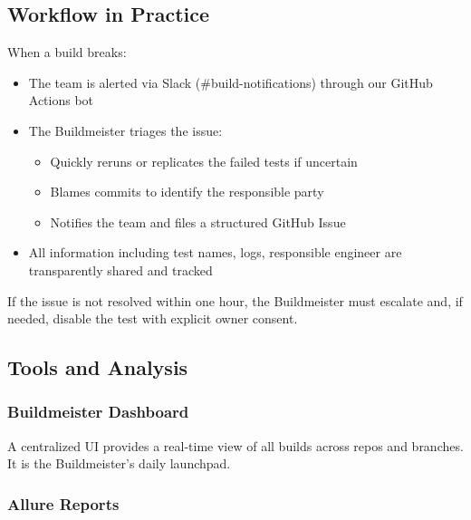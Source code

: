 \documentclass{article}
\begin{document}
\subsection{Workflow in Practice}

When a build breaks:

\begin{itemize}

  \item The team is alerted via Slack (\#build-notifications) through our GitHub
    Actions bot

  \item The Buildmeister triages the issue:

    \begin{itemize}

      \item Quickly reruns or replicates the failed tests if uncertain

      \item Blames commits to identify the responsible party

      \item Notifies the team and files a structured GitHub Issue
    \end{itemize}

  \item All information including test names, logs, responsible engineer are transparently
    shared and tracked
\end{itemize}

If the issue is not resolved within one hour, the Buildmeister must escalate and,
if needed, disable the test with explicit owner consent.

\subsection{Tools and Analysis}

\subsubsection{Buildmeister Dashboard}

A centralized UI provides a real-time view of all builds across repos and branches.
It is the Buildmeister's daily launchpad.

\subsubsection{Allure Reports}
\end{document}
